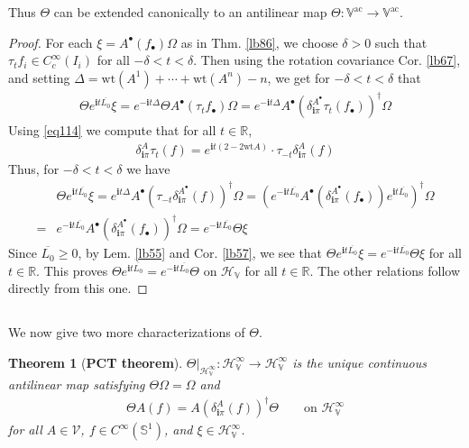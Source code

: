 \documentclass[12pt,b5paper,notitlepage]{article}
\theoremstyle{definition}
\theoremstyle{plain}
\newtheorem{thm}[df]{Theorem}
\newcommand{\ovl}{\overline}
\newcommand{\im}{\mathbf{i}}
\newcommand{\blt}{\bullet}
\newcommand{\Vbb}{\mathbb V}
\newcommand{\Rbb}{\mathbb R}
\newcommand{\wt}{\mathrm{wt}}
\newcommand{\Sbb}{{\mathbb S}}
\newcommand{\HV}{\mathcal H_{\mathbb V}}
\newcommand{\ac}{\mathrm{ac}}
\newcommand{\MV}{\mathcal V}
\numberwithin{equation}{section}
\begin{document}
Thus $\Theta$ can be extended canonically to an antilinear map $\Theta:\Vbb^\ac\rightarrow\Vbb^\ac$.

\begin{proof}
For each $\xi=A^\blt(f_\blt)\Omega$ as in Thm. \ref{lb86}, we choose $\delta>0$ such that $\tau_tf_i\in C_c^\infty(I_i)$ for all $-\delta<t<\delta$.  Then using the rotation covariance Cor. \ref{lb67}, and setting $\Delta=\wt(A^1)+\cdots+\wt(A^n)-n$, we get for $-\delta<t<\delta$ that
\begin{align*}
\Theta e^{\im t\ovl{L_0}}\xi=e^{-\im t\Delta}\Theta A^\blt(\tau_tf_\blt)\Omega=e^{-\im t\Delta}A^\blt(\delta^{A^\blt}_{\im\pi}\tau_t(f_\blt))^\dagger\Omega
\end{align*}
Using \eqref{eq114} we compute that for all $t\in\Rbb$,
\begin{align}\label{eq123}
\delta_{\im\pi}^A \tau_t(f)=e^{\im t(2-2\wt A)}\cdot \tau_{-t}\delta_{\im\pi}^A(f)
\end{align}
Thus, for $-\delta<t<\delta$ we have
\begin{align*}
&\Theta e^{\im t\ovl{L_0}}\xi=e^{\im t\Delta}A^\blt(\tau_{-t}\delta^{A^\blt}_{\im\pi}(f))^\dagger\Omega=(e^{-\im t\ovl{L_0}}A^\blt(\delta^{A^\blt}_{\im\pi}(f_\blt))e^{\im t\ovl{L_0}})^\dagger\Omega\\
=&e^{-\im t\ovl{L_0}}A^\blt(\delta^{A^\blt}_{\im\pi}(f_\blt))^\dagger\Omega=e^{-\im t\ovl{L_0}}\Theta\xi
\end{align*}
Since $\ovl{L_0}\geq0$, by Lem. \ref{lb55} and Cor. \ref{lb57}, we see that $\Theta e^{\im t\ovl{L_0}}\xi=e^{-\im t\ovl{L_0}}\Theta\xi$ for all $t\in\Rbb$. This proves $\Theta e^{\im t\ovl{L_0}}=e^{-\im t\ovl{L_0}}\Theta$ on $\HV$ for all $t\in\Rbb$. The other relations follow directly from this one.
\end{proof}



\subsection{}

We now give two more characterizations of $\Theta$.


\begin{thm}[\textbf{PCT theorem}]\label{lb89}
$\Theta|_{\HV^\infty}:\HV^\infty\rightarrow\HV^\infty$ is the unique continuous antilinear map satisfying $\Theta\Omega=\Omega$ and
\begin{align}\label{eq122}
\Theta A(f)=A(\delta^A_{\im\pi}(f))^\dagger\Theta \qquad\text{on }\HV^\infty
\end{align}
for all $A\in\MV$, $f\in C^\infty(\Sbb^1)$, and $\xi\in\HV^\infty$. 
\end{thm}
\end{document}
